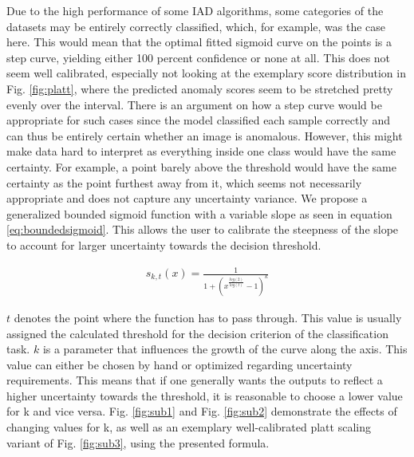 Due to the high performance of some IAD algorithms, some categories 
of the datasets may be entirely correctly classified, which, for example, was the case here. This would mean that the optimal fitted sigmoid curve on the points 
is a step curve, yielding either 100 percent confidence or none at all. This does not seem well calibrated, especially not looking at the exemplary score distribution in Fig. \ref{fig:platt}, where the predicted anomaly scores seem to be stretched pretty evenly over the interval. There is an argument on how a step 
curve would be appropriate for such cases since the model classified each sample correctly and can thus be entirely certain whether an 
image is anomalous. However, this might make data hard to interpret as everything inside one class 
would have the same certainty. For example, a point barely above the threshold would have the same certainty as the point furthest away from it, 
which seems not necessarily appropriate and does not capture any uncertainty variance.
We propose a generalized bounded sigmoid function with a variable slope \cite{bounded_sigmoid} as seen in equation \ref{eq:boundedsigmoid}. This allows the user to calibrate the steepness of the slope to account for larger uncertainty 
towards the decision threshold.

\begin{equation}
    \label{eq:boundedsigmoid}
    \begin{split}
        s_{k, t}(x) = \frac{1}{1 + (x^{\frac{log(2)}{log(t)}} - 1)^{k}}
    \end{split}
\end{equation}

$t$ denotes the point where the function has to pass through. This value is usually assigned the calculated threshold for the decision criterion of the classification task. $k$ is a parameter 
that influences the growth of the curve along the axis. This value can either be chosen by hand or optimized regarding uncertainty requirements. This means that if one generally wants the 
outputs to reflect a higher uncertainty towards the threshold, it is reasonable to choose a lower value for k and vice versa. Fig. \ref{fig:sub1} and Fig. \ref{fig:sub2} demonstrate the effects of changing values for k, as well 
as an exemplary well-calibrated platt scaling variant of Fig. \ref{fig:sub3}, using the presented formula.

